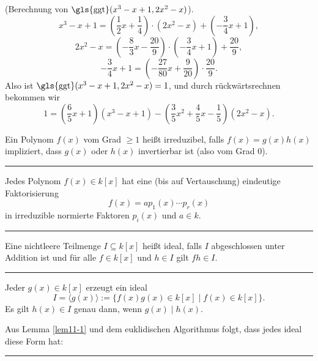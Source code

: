 \documentclass[9pt]{article}
\begin{document}
\begin{bsp}
(Berechnung von $\text{\gls{ggt}}(x^3 - x + 1, 2x^2 - x)$). 
\[
x^3 - x + 1 = \left(\frac{1}{2}x + \frac{1}{4}\right) \cdot (2x^2 - x) + \left(-\frac{3}{4}x + 1\right),
\]
\[
2x^2 - x = \left(-\frac{8}{3}x - \frac{20}{9}\right) \cdot \left(-\frac{3}{4}x + 1\right) + \frac{20}{9},
\]
\[
-\frac{3}{4}x + 1 = \left(-\frac{27}{80}x + \frac{9}{20}\right) \cdot \frac{20}{9}.
\]
Also ist $\text{\gls{ggt}}(x^3 - x + 1, 2x^2 - x) = 1$, und durch rückwärtsrechnen bekommen wir  
\[
1 = \left(\frac{6}{5}x + 1\right)(x^3 - x + 1) - \left(\frac{3}{5}x^2 + \frac{4}{5}x - \frac{1}{5}\right)(2x^2 - x).
\]

Ein \gls{Polynom} $f(x)$ vom Grad $\geq 1$ heißt irreduzibel, falls $f(x) = g(x)h(x)$ impliziert, dass $g(x)$ oder $h(x)$ invertierbar ist (also vom Grad $0$).   \\
\end{bsp} \noindent \rule{8cm}{0.4pt}

\begin{satz}
Jedes \gls{Polynom} $f(x) \in k[x]$ hat eine (bis auf Vertauschung) eindeutige \gls{Faktorisierung}  
\[ f(x) = a p_1(x) \cdots p_r(x) \]  
in irreduzible normierte Faktoren $p_i(x)$ und $a \in k$.  
 \end{satz} \noindent \rule{8cm}{0.4pt}

\begin{defi} 
Eine nichtleere Teilmenge $I \subseteq k[x]$ heißt \Gls{ideal}, falls $I$ abgeschlossen unter Addition ist und für alle $f \in k[x]$ und $h \in I$ gilt $fh \in I$.   
\end{defi} \noindent \rule{8cm}{0.4pt}

\begin{bsp}
Jeder $g(x) \in k[x]$ erzeugt ein \Gls{ideal}  
\[ I = \langle g(x) \rangle := \{f(x)g(x) \in k[x] \mid f(x) \in k[x]\}. \]  
Es gilt $h(x) \in I$ genau dann, wenn $g(x) \mid h(x)$.  

Aus Lemma \ref{lem11-1} und dem euklidischen Algorithmus folgt, dass jedes \Gls{ideal} diese Form hat:  
\end{bsp} \noindent \rule{8cm}{0.4pt}
\end{document}

